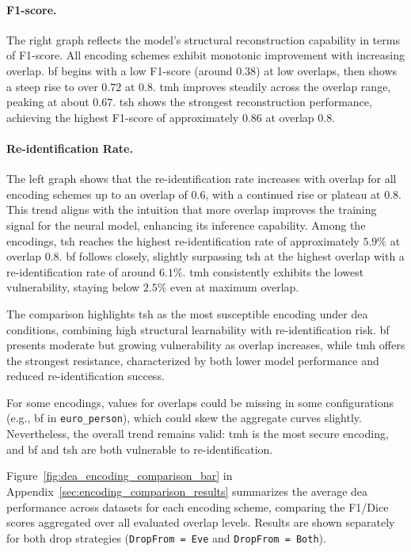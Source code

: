 \paragraph{F1-score.}
The right graph reflects the model's structural reconstruction capability in terms of F1-score.
All encoding schemes exhibit monotonic improvement with increasing overlap.
\ac{bf} begins with a low F1-score (around $0.38$) at low overlaps, then shows a steep rise to over $0.72$ at $0.8$.
\ac{tmh} improves steadily across the overlap range, peaking at about $0.67$.
\ac{tsh} shows the strongest reconstruction performance, achieving the highest F1-score of approximately $0.86$ at overlap $0.8$.

\paragraph{Re-identification Rate.}
The left graph shows that the re-identification rate increases with overlap for all encoding schemes up to an overlap of $0.6$, with a continued rise or plateau at $0.8$.
This trend aligns with the intuition that more overlap improves the training signal for the neural model, enhancing its inference capability.
Among the encodings, \ac{tsh} reaches the highest re-identification rate of approximately $5.9\%$ at overlap $0.8$.
\ac{bf} follows closely, slightly surpassing \ac{tsh} at the highest overlap with a re-identification rate of around $6.1\%$.
\ac{tmh} consistently exhibits the lowest vulnerability, staying below $2.5\%$ even at maximum overlap.

The comparison highlights \ac{tsh} as the most susceptible encoding under \ac{dea} conditions, combining high structural learnability with re-identification risk.
\ac{bf} presents moderate but growing vulnerability as overlap increases, while \ac{tmh} offers the strongest resistance, characterized by both lower model performance and reduced re-identification success.

For some encodings, values for overlaps could be missing in some configurations (e.g., \ac{bf} in \texttt{euro\_person}), which could skew the aggregate curves slightly.
Nevertheless, the overall trend remains valid: \ac{tmh} is the most secure encoding, and \ac{bf} and \ac{tsh} are both vulnerable to re-identification.

Figure~\ref{fig:dea_encoding_comparison_bar} in Appendix~\ref{sec:encoding_comparison_results} summarizes the average \ac{dea} performance across datasets for each encoding scheme, comparing the F1/Dice scores aggregated over all evaluated overlap levels.
Results are shown separately for both drop strategies (\texttt{DropFrom = Eve} and \texttt{DropFrom = Both}).

